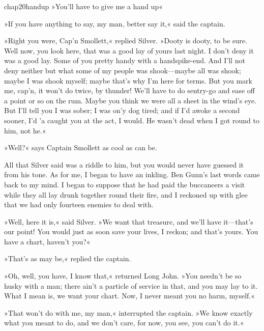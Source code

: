 
\begin{bwbigpic}
	[\picsize]
	{chap20handup}
	{»You'll have to give me a hand up«}
\end{bwbigpic}

»If you have anything to say, my man, better say it,« said the captain.

»Right you were, Cap'n Smollett,« replied Silver. »Dooty is dooty, to be sure. Well now, you look here, that was a good lay of yours last night. I don't deny it was a good lay. Some of you pretty handy with a handspike-end. And I'll not deny neither but what some of my people was shook—maybe all was shook; maybe I was shook myself; maybe that's why I'm here for terms. But you mark me, cap'n, it won't do twice, by thunder! We'll have to do sentry-go and ease off a point or so on the rum. Maybe you think we were all a sheet in the wind's eye. But I'll tell you I was sober; I was on'y dog tired; and if I'd awoke a second sooner, I'd 'a caught you at the act, I would. He wasn't dead when I got round to him, not he.«

»Well?« says Captain Smollett as cool as can be.

All that Silver said was a riddle to him, but you would never have guessed it from his tone. As for me, I began to have an inkling. Ben Gunn's last words came back to my mind. I began to suppose that he had paid the buccaneers a visit while they all lay drunk together round their fire, and I reckoned up with glee that we had only fourteen enemies to deal with.

»Well, here it is,« said Silver. »We want that treasure, and we'll have it—that's our point! You would just as soon save your lives, I reckon; and that's yours. You have a chart, haven't you?«

»That's as may be,« replied the captain.

»Oh, well, you have, I know that,« returned Long John. »You needn't be so husky with a man; there ain't a particle of service in that, and you may lay to it. What I mean is, we want your chart. Now, I never meant you no harm, myself.«

»That won't do with me, my man,« interrupted the captain. »We know exactly what you meant to do, and we don't care, for now, you see, you can't do it.«

